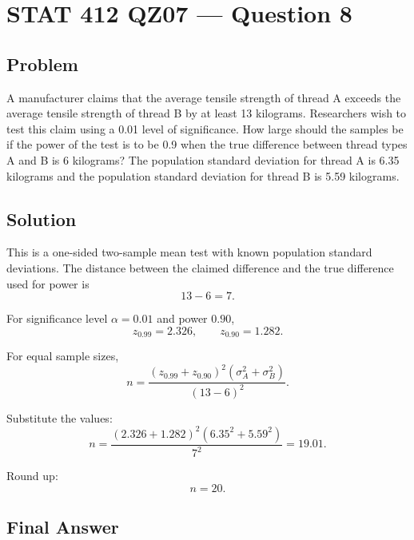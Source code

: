 \documentclass[11pt]{article}
\begin{document}
\section*{STAT 412 QZ07 --- Question 8}

\subsection*{Problem}

A manufacturer claims that the average tensile strength of thread A exceeds the average tensile strength of thread B by at least 13 kilograms. Researchers wish to test this claim using a 0.01 level of significance. How large should the samples be if the power of the test is to be 0.9 when the true difference between thread types A and B is 6 kilograms? The population standard deviation for thread A is 6.35 kilograms and the population standard deviation for thread B is 5.59 kilograms.

\subsection*{Solution}

This is a one-sided two-sample mean test with known population standard deviations. The distance between the claimed difference and the true difference used for power is
\[
13-6=7.
\]

For significance level $\alpha=0.01$ and power $0.90$,
\[
z_{0.99}=2.326,\qquad z_{0.90}=1.282.
\]

For equal sample sizes,
\[
n=\frac{(z_{0.99}+z_{0.90})^2(\sigma_A^2+\sigma_B^2)}{(13-6)^2}.
\]

Substitute the values:
\[
n=\frac{(2.326+1.282)^2(6.35^2+5.59^2)}{7^2}=19.01.
\]

Round up:
\[
n=20.
\]

\subsection*{Final Answer}

\end{document}
